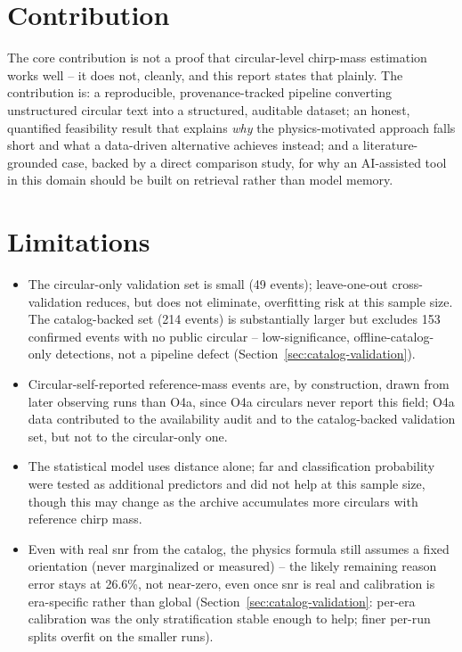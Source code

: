 \section{Contribution}

The core contribution is not a proof that circular-level chirp-mass estimation works well -- it does not, cleanly, and this report states that plainly. The contribution is: a reproducible, provenance-tracked pipeline converting unstructured circular text into a structured, auditable dataset; an honest, quantified feasibility result that explains \emph{why} the physics-motivated approach falls short and what a data-driven alternative achieves instead; and a literature-grounded case, backed by a direct comparison study, for why an AI-assisted tool in this domain should be built on retrieval rather than model memory.

\section{Limitations}

\begin{itemize}
    \item The circular-only validation set is small (49 events); leave-one-out cross-validation reduces, but does not eliminate, overfitting risk at this sample size. The catalog-backed set (214 events) is substantially larger but excludes 153 confirmed events with no public circular -- low-significance, offline-catalog-only detections, not a pipeline defect (Section~\ref{sec:catalog-validation}).
    \item Circular-self-reported reference-mass events are, by construction, drawn from later observing runs than O4a, since O4a circulars never report this field; O4a data contributed to the availability audit and to the catalog-backed validation set, but not to the circular-only one.
    \item The statistical model uses distance alone; \gls{far} and classification probability were tested as additional predictors and did not help at this sample size, though this may change as the archive accumulates more circulars with reference chirp mass.
    \item Even with real \gls{snr} from the catalog, the physics formula still assumes a fixed orientation (never marginalized or measured) -- the likely remaining reason error stays at 26.6\%, not near-zero, even once \gls{snr} is real and calibration is era-specific rather than global (Section~\ref{sec:catalog-validation}: per-era calibration was the only stratification stable enough to help; finer per-run splits overfit on the smaller runs).
\end{itemize}

